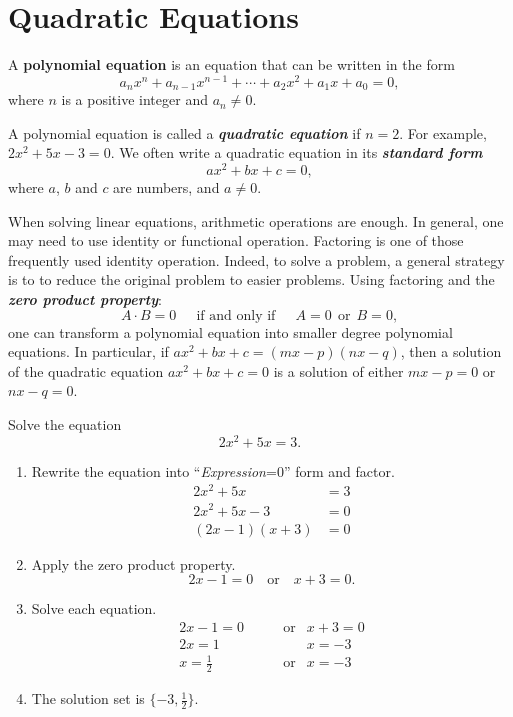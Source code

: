 \documentclass[
  en,11pt]{elegantbook}
\renewenvironment{example}[1][]{
  \refstepcounter{exam}
  \par\noindent\textbf{\color{main}{\examplename} \theexam #1}
  \rmfamily
}{
  \par\ignorespacesafterend
}
\begin{document}
\hypertarget{quadratic-equations}{%
\section{Quadratic Equations}\label{quadratic-equations}}

A \textbf{polynomial equation} is an equation that can be written in the form
\[
a_{n}x^{n}+a_{n-1}x^{n-1}+\cdots+a_{2}x^{2}+a_{1}x+a_{0}=0,
\]
where \(n\) is a positive integer and \(a_n\ne 0\).

A polynomial equation is called a \textbf{\emph{quadratic equation}} if \(n=2\). For example, \(2x^2+5x-3=0\). We often write a quadratic equation in its \textbf{\emph{standard form}}
\[a x^2+bx+c=0,\]
where \(a\), \(b\) and \(c\) are numbers, and \(a\neq 0\).

When solving linear equations, arithmetic operations are enough. In general, one may need to use identity or functional operation. Factoring is one of those frequently used identity operation. Indeed, to solve a problem, a general strategy is to to reduce the original problem to easier problems. Using factoring and the \textbf{\emph{zero product property}}:
\[A\cdot B=0 \quad ~~\text{if and only if}~~  \quad A=0 ~~\text{or}~~ B=0,\]
one can transform a polynomial equation into smaller degree polynomial equations. In particular, if \(ax^2+bx+c=(mx-p)(nx-q)\), then a solution of the quadratic equation \(ax^2+bx+c=0\) is a solution of either \(mx-p=0\) or \(nx-q=0\).

\begin{example}
Solve the equation
\[2x^2+5x=3.\]
\end{example}

\begin{solution}



\begin{enumerate}
\def\labelenumi{\arabic{enumi}.}
\item
  Rewrite the equation into ``\emph{Expression}=0'' form and factor.
  \[
   \begin{aligned}
       2x^2+5x&=3\\
       2x^2+5x-3&=0\\
       (2x-1)(x+3)&=0
   \end{aligned}
   \]
\item
  Apply the zero product property.
  \[2x-1=0\quad\text{or}\quad x+3=0.\]
\item
  Solve each equation.
  \[
   \begin{aligned}
       2x-1 =0       & \qquad\text{or} & x+3 =0  \\
       2x   =1       &    & x   =-3 \\
       x    =\frac12 & \qquad\text{or} & x   =-3
   \end{aligned}
   \]
\item
  The solution set is \(\{-3, \frac12\}\).
\end{enumerate}

\end{solution}
\end{document}
